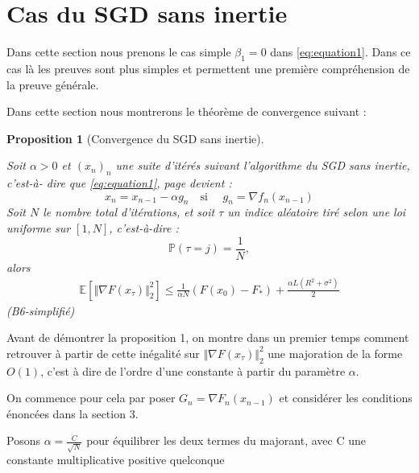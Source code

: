 \documentclass{article}
\newtheorem{prop}{Proposition}
\begin{document}
\bigskip

\section{Cas du SGD sans inertie}


Dans cette section nous prenons le cas simple $\beta_1=0$ dans \eqref{eq:equation1}. Dans ce cas là les preuves sont plus simples et permettent une première compréhension de la preuve générale.

Dans cette section nous montrerons le théorème de convergence suivant :

\begin{prop}[Convergence du SGD sans inertie]
\label{prop:conv_sans_inertie}

Soit $\alpha>0$ et $(x_n)_n$ une suite d'itérés suivant l'algorithme du SGD sans inertie, c'est-à- dire que \eqref{eq:equation1}, page \pageref{eq:equation1} devient :
\begin{equation}
    x_n=x_{n-1}-\alpha g_n  \quad \text{si  } \quad g_n= \nabla f_n(x_{n-1})
\end{equation}
Soit $N$ le nombre total d'itérations, et soit $\tau$ un indice aléatoire tiré selon une loi uniforme sur $[1,N]$, c'est-à-dire : $$\mathbb{P}(\tau = j) = \frac{1}{N}, $$
alors 
\begin{eqnarray*}
\mathbb{E}\left[ \Vert \nabla F(x_\tau) \Vert ^2_2\right] \leq \frac{1}{\alpha N} (F(x_0)-F_*) + \frac{\alpha L (R^2+ \sigma^2)}{2} 
\end{eqnarray*}
\hspace{\fill}(B6-simplifié) 
\end{prop}



\bigskip

Avant de démontrer la proposition 1, on montre dans un premier temps comment  retrouver à partir de cette inégalité sur $ \Vert \nabla F(x_\tau) \Vert ^2_2$ une majoration de la forme $O(1) $, c'est à dire de l'ordre d'une constante à partir du paramètre $\alpha$.

\bigskip

On commence pour cela par poser $G_n= \nabla F_n(x_{n-1})$ et considérer les conditions énoncées dans la section 3.

 \bigskip

 Posons $\alpha=\frac{C}{\sqrt{N}}$ pour équilibrer les deux termes du majorant, avec C une constante multiplicative positive quelconque

\newline
\end{document}
